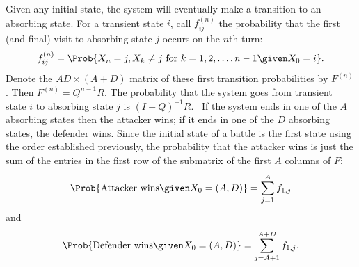 \documentclass[12pt]{article}
\begin{document}
Given any initial state, the system will eventually make a transition to
an absorbing state.  For a transient state \( i \), call \( f_{ij}^{(n)}
\) the probability that the first (and final) visit to absorbing state \(
j \) occurs on the \( n \)th turn:
\[
    f_{ij}^{(n)} = \Prob{X_n = j, X_k \ne j \text{ for } k=1,2,\dots,
    n-1 \given X_0 = i}.
\] Denote the \( AD \times (A + D) \) matrix of these first transition
probabilities by \( F^{(n)} \).  Then \( F^{(n)} = Q^{n-1}R \).  The
probability that the system goes from transient state \( i \) to
absorbing state \( j \) is \( (I - Q)^{-1} R \).~%
If the system ends in one of the \( A \) absorbing states then the
attacker wins; if it ends in one of the \( D \) absorbing states, the
defender wins.  Since the initial state of a battle is the first state
using the order established previously, the probability that the
attacker wins is just the sum of the entries in the first row of the
submatrix of the first \( A \) columns of \( F \):
\[
    \Prob{\text{Attacker wins} \given X_0 = (A,D)} = \sum\limits_{j=1}^{A}
    f_{1, j}
\] and
\[
    \Prob{\text{Defender wins} \given X_0 = (A,D)} = \sum\limits_{j=A+1}^
    {A+D} f_{1, j}.
\]
\end{document}
